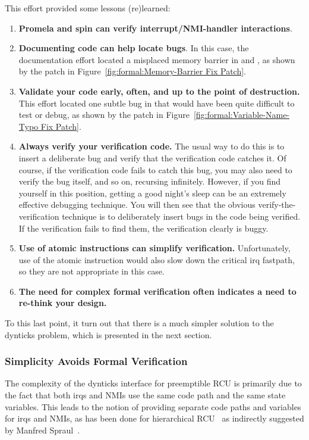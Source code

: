 This effort provided some lessons (re)learned:

\begin{enumerate}
\item	{\bf Promela and spin can verify interrupt/NMI-handler
	interactions}.
\item	{\bf Documenting code can help locate bugs}.
	In this case, the documentation effort located
	a misplaced memory barrier in
	 and ,
	as shown by the patch in
	Figure~\ref{fig:formal:Memory-Barrier Fix Patch}.
\item	{\bf Validate your code early, often, and up to the point
	of destruction.}
	This effort located one subtle bug in
	that would have been quite difficult to test or debug, as
	shown by the patch in
	Figure~\ref{fig:formal:Variable-Name-Typo Fix Patch}.
\item	{\bf Always verify your verification code.}
	The usual way to do this is to insert a deliberate bug
	and verify that the verification code catches it.  Of course,
	if the verification code fails to catch this bug, you may also
	need to verify the bug itself, and so on, recursing infinitely.
	However, if you find yourself in this position,
	getting a good night's sleep
	can be an extremely effective debugging technique.
	You will then see that the obvious verify-the-verification
	technique is to deliberately insert bugs in the code being
	verified.
	If the verification fails to find them, the verification clearly
	is buggy.
\item	{\bf Use of atomic instructions can simplify verification.}
	Unfortunately, use of the  atomic instruction
	would also slow down the critical irq fastpath, so they
	are not appropriate in this case.
\item	{\bf The need for complex formal verification often indicates
	a need to re-think your design.}
\end{enumerate}

To this last point, it turn out that there is a much simpler solution to
the dynticks problem, which is presented in the next section.

\subsubsection{Simplicity Avoids Formal Verification}
\label{sec:formal:Simplicity Avoids Formal Verification}

The complexity of the dynticks interface for preemptible RCU is primarily
due to the fact that both irqs and NMIs use the same code path and the
same state variables.
This leads to the notion of providing separate code paths and variables
for irqs and NMIs, as has been done for
hierarchical RCU~\cite{PaulEMcKenney2008HierarchicalRCU}
as indirectly suggested by
Manfred Spraul~\cite{ManfredSpraul2008StateMachineRCU}.

